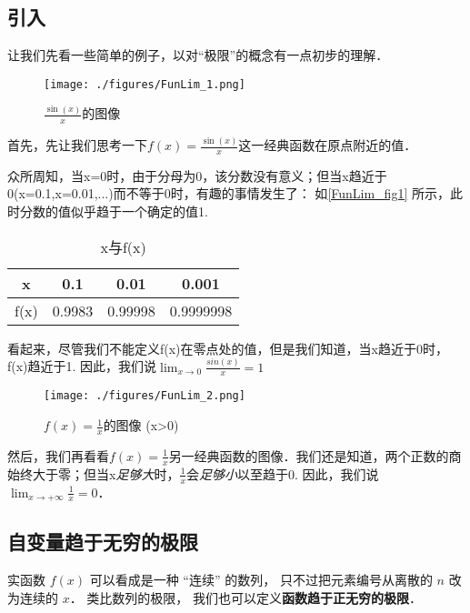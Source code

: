 

\subsection{引入}
让我们先看一些简单的例子，以对“极限”的概念有一点初步的理解．
\begin{example}{}
\begin{figure}[ht]
\centering
\texttt{[image: ./figures/FunLim\_1.png]}
\caption{$\frac{\sin(x)}{x}$的图像} \label{FunLim_fig1}
\end{figure}
首先，先让我们思考一下$f(x)=\frac{\sin(x)}{x}$这一经典函数在原点附近的值．

众所周知，当x=0时，由于分母为0，该分数没有意义；但当x趋近于0(x=0.1,x=0.01,...)而不等于0时，有趣的事情发生了： 如\autoref{FunLim_fig1} 所示，此时分数的值似乎趋于一个确定的值1.

\begin{table}[ht]
\centering
\caption{x与f(x)}\label{FunLim_tab1}
\begin{tabular}{|c|c|c|c|}
\hline
x & 0.1 & 0.01 & 0.001 \\
\hline
f(x) & 0.9983 & 0.99998 & 0.9999998 \\
\hline
\end{tabular}
\end{table}
看起来，尽管我们不能定义f(x)在零点处的值，但是我们知道，当x趋近于0时，f(x)趋近于1. 因此，我们说$\lim_{x\to0}\frac{sin(x)}{x}=1$
\end{example}

\begin{example}{}
\begin{figure}[ht]
\centering
\texttt{[image: ./figures/FunLim\_2.png]}
\caption{$f(x)=\frac{1}{x}$的图像 (x>0)} \label{FunLim_fig2}
\end{figure}
然后，我们再看看$f(x)=\frac{1}{x}$另一经典函数的图像．我们还是知道，两个正数的商始终大于零；但当x\textsl{足够大}时，$\frac{1}{x}$会\textsl{足够小}以至趋于0. 因此，我们说$\lim_{x\to+\infty}\frac{1}{x}=0$．
\end{example}

\subsection{自变量趋于无穷的极限}
实函数 $f(x)$ 可以看成是一种 “连续” 的数列， 只不过把元素编号从离散的 $n$ 改为连续的 $x$． 类比数列的极限， 我们也可以定义\textbf{函数趋于正无穷的极限}．

